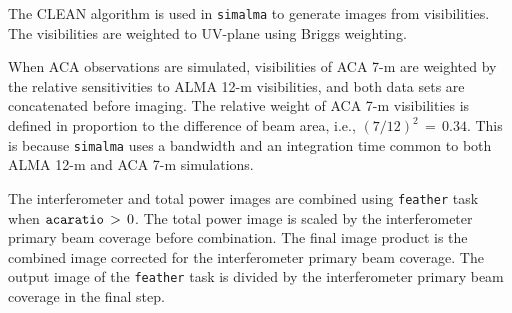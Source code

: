 The CLEAN algorithm is used in {\tt simalma} to generate images
from visibilities. The visibilities are weighted to UV-plane using
Briggs weighting.

When ACA observations are simulated, visibilities of ACA 7-m are
weighted by the relative sensitivities to ALMA 12-m visibilities, 
and both data sets are concatenated before imaging. 
The relative weight of ACA 7-m visibilities is defined in proportion
to the difference of beam area, i.e., $ (7/12)^2 \, = \, 0.34 $.
This is because {\tt simalma} uses a bandwidth and an integration time
common to both ALMA 12-m and ACA 7-m simulations.

The interferometer and total power images are combined using 
{\tt feather} task when $ {\tt acaratio} \, > \, 0 $. 
The total power image is scaled by the interferometer primary beam
coverage before combination. 
The final image product is the combined image corrected for the
interferometer primary beam coverage. The output image of the
{\tt feather} task is divided by the interferometer primary beam
coverage in the final step.

